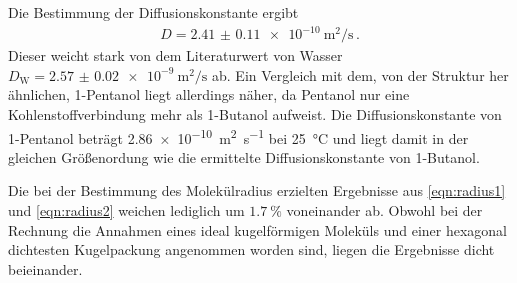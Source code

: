 Die Bestimmung der Diffusionskonstante ergibt
\begin{align*}
  D = \SI{2.41(011)e-10}{\square\meter\per\second}\,.
\end{align*}
Dieser weicht stark von dem Literaturwert von Wasser $D_\text{W} = \SI{2.57(2)e-9}{\square\meter\per\second}$ \cite{wang} ab.
Ein Vergleich mit dem, von der Struktur her ähnlichen, 1-Pentanol liegt allerdings näher, da Pentanol nur eine Kohlenstoffverbindung mehr als 1-Butanol aufweist.
Die Diffusionskonstante von 1-Pentanol beträgt \SI{2.86e-10}{\square\meter\per\second} bei \SI{25}{\degreeCelsius} \cite{Holz} und liegt damit in der gleichen Größenordung wie die ermittelte Diffusionskonstante von 1-Butanol.


Die bei der Bestimmung des Molekülradius erzielten Ergebnisse aus \eqref{eqn:radius1} und \eqref{eqn:radius2} weichen lediglich um $\SI{1.7}{\percent}$ voneinander ab.
Obwohl bei der Rechnung die Annahmen eines ideal kugelförmigen Moleküls und einer hexagonal dichtesten Kugelpackung
angenommen worden sind, liegen die Ergebnisse dicht beieinander.
